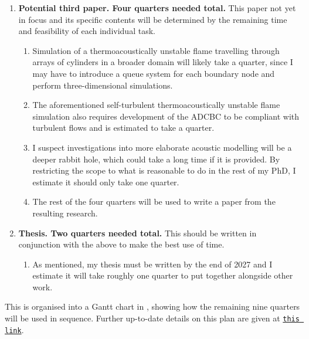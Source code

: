 \begin{enumerate}
\begin{enumerate}
    \end{enumerate}
\item \textbf{Potential third paper. Four quarters needed total.} This paper not yet in focus and its specific contents will be determined by the remaining time and feasibility of each individual task.
    \begin{enumerate}
    \item Simulation of a thermoacoustically unstable flame travelling through arrays of cylinders in a broader domain will likely take a quarter, since I may have to introduce a queue system for each boundary node and perform three-dimensional simulations.
    \item The aforementioned self-turbulent thermoacoustically unstable flame simulation also requires development of the ADCBC to be compliant with turbulent flows and is estimated to take a quarter.
    \item I suspect investigations into more elaborate acoustic modelling will be a deeper rabbit hole, which could take a long time if it is provided. By restricting the scope to what is reasonable to do in the rest of my PhD, I estimate it should only take one quarter.
    \item The rest of the four quarters will be used to write a paper from the resulting research.
    \end{enumerate}
\item \textbf{Thesis. Two quarters needed total.} This should be written in conjunction with the above to make the best use of time.
    \begin{enumerate}
    \item As mentioned, my thesis must be written by the end of 2027 and I estimate it will take roughly one quarter to put together alongside other work.
    \end{enumerate}
\end{enumerate}
This is organised into a Gantt chart in , showing how the remaining nine quarters will be used in sequence. Further up-to-date details on this plan are given at \href{https://www.dropbox.com/scl/fi/4w62xppcfkywnr7nm8a6v/plan-Y3.md?rlkey=yx4ez0nmqjaabqseotnzfiqsn&st=lll313fe&dl=0}{\texttt{this link}}.


